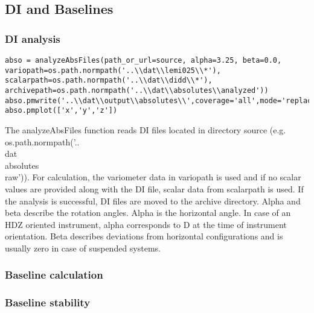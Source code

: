\subsection{DI and Baselines}

\subsubsection{DI analysis}

\begin{verbatim}
abso = analyzeAbsFiles(path_or_url=source, alpha=3.25, beta=0.0, variopath=os.path.normpath('..\\dat\\lemi025\\*'), scalarpath=os.path.normpath('..\\dat\\didd\\*'), archivepath=os.path.normpath('..\\dat\\absolutes\\analyzed'))
abso.pmwrite('..\\dat\\output\\absolutes\\',coverage='all',mode='replace',filenamebegins='absolutes_lemi')
abso.pmplot(['x','y','z'])
\end{verbatim}
The analyzeAbsFiles function reads DI files located in directory source (e.g. os.path.normpath('..\\dat\\absolutes\\raw')). For calculation, the variometer data in variopath is used and if no scalar values are provided along with the DI file, scalar data from scalarpath is used. If the analysis is successful, DI files are moved to the archive directory. Alpha and beta describe the rotation angles. Alpha is the horizontal angle. In case of an HDZ oriented instrument, alpha corresponds to D at the time of instrument orientation. Beta describes deviations from horizontal configurations and is usually zero in case of suspended systems.



\subsubsection{Baseline calculation}

\subsubsection{Baseline stability}

